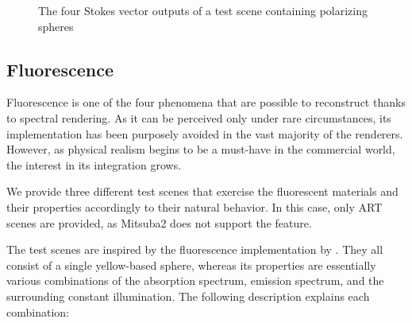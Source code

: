 \begin{figure}[h]
\begin{tabular}{cc}
	\end{tabular}
	\caption{The four Stokes vector outputs of a test scene containing polarizing spheres}
	\label{fig:polar_spheres}
\end{figure}

\subsection{Fluorescence}

Fluorescence is one of the four phenomena that are possible to reconstruct thanks to spectral rendering. As it can be perceived only under rare circumstances, its implementation has been purposely avoided in the vast majority of the renderers. However, as physical realism begins to be a must-have in the commercial world, the interest in its integration grows.

We provide three different test scenes that exercise the fluorescent materials and their properties accordingly to their natural behavior. In this case, only ART scenes are provided, as Mitsuba2 does not support the feature. 

The test scenes are inspired by the fluorescence implementation by \citet{mojzik2018handling}. They all consist of a single yellow-based sphere, whereas its properties are essentially various combinations of the absorption spectrum, emission spectrum, and the surrounding constant illumination. The following description explains each combination:

